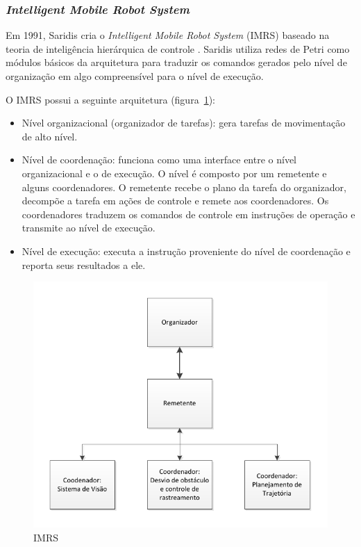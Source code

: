 \subsubsection{\textit{Intelligent Mobile Robot System}}
Em 1991, Saridis \cite{wang1991petri} cria o \emph{Intelligent Mobile
Robot System} (IMRS) baseado na teoria de inteligência hierárquica de controle
\cite{saridis1988analytical}. Saridis utiliza redes de Petri como módulos
básicos da arquitetura para traduzir os comandos gerados pelo nível de
organização em algo compreensível para o nível de execução.

O IMRS possui a seguinte arquitetura (figura~\ref{Saridis_1}):
\begin{itemize}
  \item Nível organizacional (organizador de tarefas): gera tarefas de
  movimentação de alto nível.
  \item Nível de coordenação: funciona como uma interface entre o nível
  organizacional e o de execução. O nível é composto por um remetente e alguns
  coordenadores. O remetente recebe o plano da tarefa do organizador, decompõe a
  tarefa em ações de controle e remete aos coordenadores. Os coordenadores
  traduzem os comandos de controle em instruções de operação e transmite ao
  nível de execução.
  \item Nível de execução: executa a instrução proveniente do nível de
  coordenação e reporta seus resultados a ele.
\end{itemize}

\begin{figure}[H]
\centering
\includegraphics[width=1\columnwidth]{figs/SARIDIS_1.pdf}
\caption{IMRS}
\label{Saridis_1} 
\end{figure}

